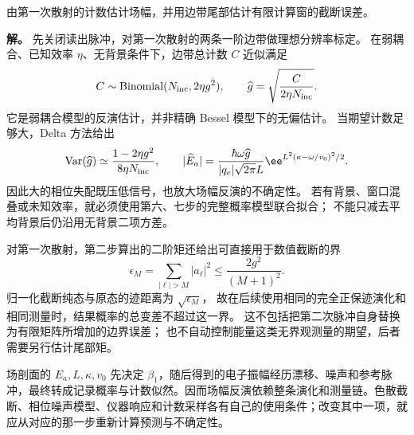 \begin{exbox}
由第一次散射的计数估计场幅，并用边带尾部估计有限计算窗的截断误差。

\textbf{解。} 先关闭读出脉冲，对第一次散射的两条一阶边带做理想分辨率标定。
在弱耦合、已知效率 $\eta$、无背景条件下，边带总计数 $C$ 近似满足
\[
 C\sim\operatorname{Binomial}(N_{\rm inc},2\eta g^2),\qquad
 \widehat g=\sqrt{\frac{C}{2\eta N_{\rm inc}}}.
\]
它是弱耦合模型的反演估计，并非精确 Bessel 模型下的无偏估计。
当期望计数足够大，Delta 方法给出
\[
 \operatorname{Var}(\widehat g)
 \simeq\frac{1-2\eta g^2}{8\eta N_{\rm inc}},\qquad
 |\widehat E_a|=\frac{\hbar\omega\widehat g}{|q_e|\sqrt{2\pi}L}
 \ee^{L^2(\kappa-\omega/v_0)^2/2}.
\]
因此大的相位失配既压低信号，也放大场幅反演的不确定性。
若有背景、窗口混叠或未知效率，就必须使用第六、七步的完整概率模型联合拟合；
不能只减去平均背景后仍沿用无背景二项方差。

对第一次散射，第二步算出的二阶矩还给出可直接用于数值截断的界
\[
 \epsilon_M=\sum_{|\ell|>M}|a_\ell|^2
 \le\frac{2g^2}{(M+1)^2}.
\]
归一化截断纯态与原态的迹距离为 $\sqrt{\epsilon_M}$，
故在后续使用相同的完全正保迹演化和相同测量时，结果概率的总变差不超过这一界。
这不包括把第二次脉冲自身替换为有限矩阵所增加的边界误差；
也不自动控制能量这类无界观测量的期望，后者需要另行估计尾部矩。

\end{exbox}

场剖面的 $E_a,L,\kappa,v_0$ 先决定 $\beta_1$，随后得到的电子振幅经历漂移、噪声和参考脉冲，最终转成记录概率与计数似然。因而场幅反演依赖整条演化和测量链。色散截断、相位噪声模型、仪器响应和计数采样各有自己的使用条件；改变其中一项，就应从对应的那一步重新计算预测与不确定性。
